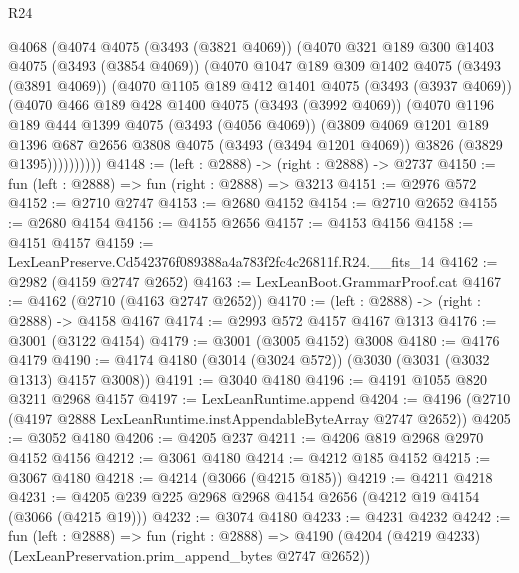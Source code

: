 \begin{lexlean}{R24}
\begin{coremodule}
      @4068
        (@4074
          @4075
          (@3493 (@3821 @4069))
          (@4070
            @321
            @189
            @300
            @1403
            @4075
            (@3493 (@3854 @4069))
            (@4070
              @1047
              @189
              @309
              @1402
              @4075
              (@3493 (@3891 @4069))
              (@4070
                @1105
                @189
                @412
                @1401
                @4075
                (@3493 (@3937 @4069))
                (@4070
                  @466
                  @189
                  @428
                  @1400
                  @4075
                  (@3493 (@3992 @4069))
                  (@4070
                    @1196
                    @189
                    @444
                    @1399
                    @4075
                    (@3493 (@4056 @4069))
                    (@3809
                      @4069
                      @1201
                      @189
                      @1396
                      @687
                      @2656
                      @3808
                      @4075
                      (@3493 (@3494 @1201 @4069))
                      @3826
                      (@3829 @1395))))))))))
@4148 := (left : @2888) -> (right : @2888) -> @2737
@4150 := fun (left : @2888) => fun (right : @2888) => @3213
@4151 := @2976 @572
@4152 := @2710 @2747
@4153 := @2680 @4152
@4154 := @2710 @2652
@4155 := @2680 @4154
@4156 := @4155 @2656
@4157 := @4153 @4156
@4158 := @4151 @4157
@4159 := LexLeanPreserve.Cd542376f089388a4a783f2fc4c26811f.R24.__fits_14
@4162 := @2982 (@4159 @2747 @2652)
@4163 := LexLeanBoot.GrammarProof.cat
@4167 := @4162 (@2710 (@4163 @2747 @2652))
@4170 := (left : @2888) -> (right : @2888) -> @4158 @4167
@4174 := @2993 @572 @4157 @4167 @1313
@4176 := @3001 (@3122 @4154)
@4179 := @3001 (@3005 @4152) @3008
@4180 := @4176 @4179
@4190 := @4174 @4180 (@3014 (@3024 @572)) (@3030 (@3031 (@3032 @1313) @4157 @3008))
@4191 := @3040 @4180
@4196 := @4191 @1055 @820 @3211 @2968 @4157
@4197 := LexLeanRuntime.append
@4204 := @4196 (@2710 (@4197 @2888 LexLeanRuntime.instAppendableByteArray @2747 @2652))
@4205 := @3052 @4180
@4206 := @4205 @237
@4211 := @4206 @819 @2968 @2970 @4152 @4156
@4212 := @3061 @4180
@4214 := @4212 @185 @4152
@4215 := @3067 @4180
@4218 := @4214 (@3066 (@4215 @185))
@4219 := @4211 @4218
@4231 := @4205 @239 @225 @2968 @2968 @4154 @2656 (@4212 @19 @4154 (@3066 (@4215 @19)))
@4232 := @3074 @4180
@4233 := @4231 @4232
@4242 := fun (left : @2888) =>
  fun (right : @2888) =>
  @4190 (@4204 (@4219 @4233) (LexLeanPreservation.prim_append_bytes @2747 @2652))

\end{coremodule}
\end{lexlean}
